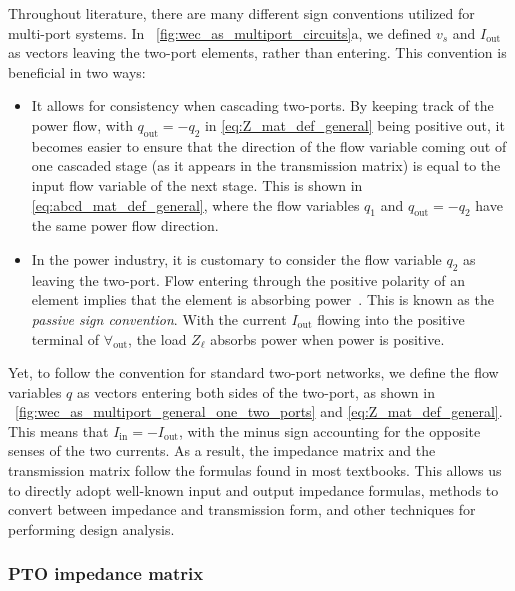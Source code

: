 \documentclass[lettersize,journal]{IEEEtran}
\begin{document}
Throughout literature, there are many different sign conventions utilized for multi-port systems. 
In \figurename~\ref{fig:wec_as_multiport_circuits}a, we defined $v_s$ and $I_{\textrm{out}}$ as vectors leaving the two-port elements, rather than entering. 
This convention is beneficial in two ways:
\begin{itemize}
         \item It allows for consistency when cascading two-ports. 
         By keeping track of the power flow, with $q_{\textrm{out}} = -q_2$ in \eqref{eq:Z_mat_def_general} being positive out, it becomes easier to ensure that the direction of the flow variable coming out of one cascaded stage (as it appears in the transmission matrix) is equal to the input flow variable of the next stage. 
         This is shown in \eqref{eq:abcd_mat_def_general}, where the flow variables $q_1$ and $q_{\textrm{out}} = -q_2$ have the same power flow direction.

         \item In the power industry, it is customary to consider the flow variable $q_2$ as leaving the two-port. 
         Flow entering through the positive polarity of an element implies that the element is absorbing power~\cite{CircuitFundamental}.
         This is known as the \textit{passive sign convention}.
         With the current $I_{\textrm{out}}$ flowing into the positive terminal of $\forall_{\textrm{out}}$, the load $Z_\ell$ absorbs power when power is positive.
\end{itemize}
Yet, to follow the convention for standard two-port networks, we define the flow variables $q$ as vectors entering both sides of the two-port, as shown in \figurename~\ref{fig:wec_as_multiport_general_one_two_ports} and \eqref{eq:Z_mat_def_general}. 
This means that $I_{\textrm{in}} = -I_{\textrm{out}}$, with the minus sign accounting for the opposite senses of the two currents. 
As a result, the impedance matrix and the transmission matrix follow the formulas found in most textbooks. 
This allows us to directly adopt well-known input and output impedance formulas, methods to convert between impedance and transmission form, and other techniques for performing design analysis.


\subsubsection{PTO impedance matrix}\label{sec:pto_impedance_matrix}
\end{document}
